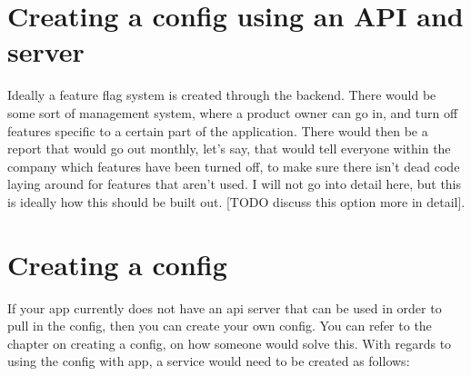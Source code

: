\section{ Creating a config using an API and server }
Ideally a feature flag system is created through the backend. There would be
some sort of management system, where a product owner can go in, and turn off
features specific to a certain part of the application. There would then be a
report that would go out monthly, let's say, that would tell everyone within the
company which features have been turned off, to make sure there isn't dead code
laying around for features that aren't used. I will not go into detail here, but
this is ideally how this should be built out. [TODO discuss this option more in
detail].

\section{ Creating a config }
If your app currently does not have an api server that can be used in order to
pull in the config, then you can create your own config. You can refer to the
chapter on creating a config, on how someone would solve this. With regards to
using the config with app, a service would need to be created as follows:


